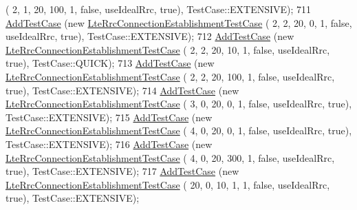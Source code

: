 \begin{DoxyCode}
       (  2,     1,     20,         100,           1, \textcolor{keyword}{false}, useIdealRrc, \textcolor{keyword}{true}), TestCase::EXTENSIVE);
711       \hyperlink{classns3_1_1TestCase_a3718088e3eefd5d6454569d2e0ddd835}{AddTestCase} (\textcolor{keyword}{new} \hyperlink{classLteRrcConnectionEstablishmentTestCase}{LteRrcConnectionEstablishmentTestCase}
       (  2,     2,     20,           0,           1, \textcolor{keyword}{false}, useIdealRrc, \textcolor{keyword}{true}), TestCase::EXTENSIVE);
712       \hyperlink{classns3_1_1TestCase_a3718088e3eefd5d6454569d2e0ddd835}{AddTestCase} (\textcolor{keyword}{new} \hyperlink{classLteRrcConnectionEstablishmentTestCase}{LteRrcConnectionEstablishmentTestCase}
       (  2,     2,     20,          10,           1, \textcolor{keyword}{false}, useIdealRrc, \textcolor{keyword}{true}), TestCase::QUICK);
713       \hyperlink{classns3_1_1TestCase_a3718088e3eefd5d6454569d2e0ddd835}{AddTestCase} (\textcolor{keyword}{new} \hyperlink{classLteRrcConnectionEstablishmentTestCase}{LteRrcConnectionEstablishmentTestCase}
       (  2,     2,     20,         100,           1, \textcolor{keyword}{false}, useIdealRrc, \textcolor{keyword}{true}), TestCase::EXTENSIVE);
714       \hyperlink{classns3_1_1TestCase_a3718088e3eefd5d6454569d2e0ddd835}{AddTestCase} (\textcolor{keyword}{new} \hyperlink{classLteRrcConnectionEstablishmentTestCase}{LteRrcConnectionEstablishmentTestCase}
       (  3,     0,     20,           0,           1, \textcolor{keyword}{false}, useIdealRrc, \textcolor{keyword}{true}), TestCase::EXTENSIVE);
715       \hyperlink{classns3_1_1TestCase_a3718088e3eefd5d6454569d2e0ddd835}{AddTestCase} (\textcolor{keyword}{new} \hyperlink{classLteRrcConnectionEstablishmentTestCase}{LteRrcConnectionEstablishmentTestCase}
       (  4,     0,     20,           0,           1, \textcolor{keyword}{false}, useIdealRrc, \textcolor{keyword}{true}), TestCase::EXTENSIVE);
716       \hyperlink{classns3_1_1TestCase_a3718088e3eefd5d6454569d2e0ddd835}{AddTestCase} (\textcolor{keyword}{new} \hyperlink{classLteRrcConnectionEstablishmentTestCase}{LteRrcConnectionEstablishmentTestCase}
       (  4,     0,     20,         300,           1, \textcolor{keyword}{false}, useIdealRrc, \textcolor{keyword}{true}), TestCase::EXTENSIVE);
717       \hyperlink{classns3_1_1TestCase_a3718088e3eefd5d6454569d2e0ddd835}{AddTestCase} (\textcolor{keyword}{new} \hyperlink{classLteRrcConnectionEstablishmentTestCase}{LteRrcConnectionEstablishmentTestCase}
       ( 20,     0,     10,           1,           1, \textcolor{keyword}{false}, useIdealRrc, \textcolor{keyword}{true}), TestCase::EXTENSIVE);

\end{DoxyCode}

